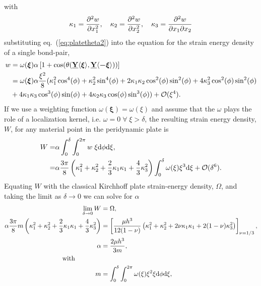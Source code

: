 %
with
%
\begin{equation}
    \kappa_1=\frac{\partial^2 w}{\partial x_1^2}, \quad \kappa_2= \frac{\partial^2 w}{\partial x_2^2}, \quad \kappa_3=\frac{\partial^2 w}{\partial x_1\partial x_2}\notag
\end{equation}
%
substituting eq.~(\ref{eq:platetheta2}) into the equation for the strain energy density of a single bond-pair,
%
\begin{align}
    w &= \omega(\boldsymbol{\xi}) \alpha \left[1+\cos(\theta(\vstate{Y}{}{\boldsymbol{\xi}},\vstate{Y}{}{\boldsymbol{-\xi}}) ) \right] \notag \\
    &= \omega(\boldsymbol{\xi}) \alpha\frac{\xi^2}{8}(\kappa_1^2\cos^4(\phi)+\kappa_2^2\sin^4(\phi)+2\kappa_1\kappa_2\cos^2(\phi)\sin^2(\phi)+4\kappa_3^2\cos^2(\phi)\sin^2(\phi) \notag \\
    &+ 4\kappa_1\kappa_3\cos^3(\phi)\sin(\phi)+4\kappa_2\kappa_3\cos(\phi)\sin^3(\phi))+\mathcal{O}(\xi^4).\notag
\end{align}
%
If we use a weighting function \(\omega(\boldsymbol{\xi})=\omega(\xi)\) and assume that the $\omega$ plays the role of a localization kernel, i.e. $\omega = 0 \; \forall \; \xi > \delta$, the resulting strain energy density, $W$, for any material point in the peridynamic plate is
%
\begin{align}
    W =& \alpha \int_{0}^\delta\int_0^{2 \pi} w\; \xi {\rm d}\phi {\rm d}\xi ,\notag \\
    =& \alpha \frac{3\pi}{8} \left(\kappa_1^2+\kappa_2^2+\frac{2}{3}\kappa_1\kappa_1+\frac{4}{3}\kappa_3^2 \right)\int_{0}^\delta \omega(\xi)\xi^3{\rm d}\xi + \mathcal{O}(\delta^6).\notag 
\end{align}
%
Equating $W$ with the classical Kirchhoff plate strain-energy density, $\Omega$, and taking the limit as $\delta \to 0$ we can solve for $\alpha$
%
\begin{align}
    \lim_{\delta \to 0}  W &= \Omega, \notag \\
    \alpha \frac{3 \pi}{8} m \left(\kappa_1^2+\kappa_2^2+\frac{2}{3}\kappa_1\kappa_1+\frac{4}{3}\kappa_3^2 \right)&= \left[ \frac{\mu h^3}{12(1-\nu)} \left(\kappa_1^2+\kappa_2^2+2\nu\kappa_1\kappa_1+2(1-\nu)\kappa_3^2 \right) \right]_{\nu=1/3}, \notag \\
    \alpha &= \frac{2 \mu h^3}{3 m}, \\
    \text{with}\qquad \qquad \notag \\
    m &= \int_{0}^{\delta} \int_{0}^{2\pi}\omega(\xi) \xi^2 \xi {\rm d}\phi {\rm d}\xi \notag,
\end{align}
